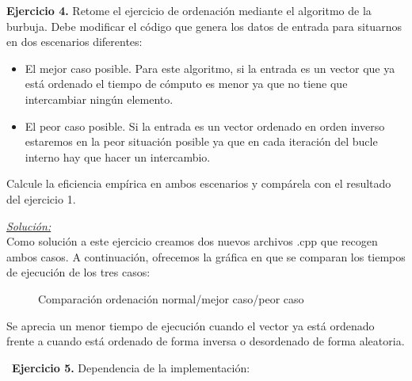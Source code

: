 \documentclass[titlepage, 12pt,a4paper]{article}
\begin{document}
	\textbf{\large Ejercicio 4.} Retome el ejercicio de ordenación mediante el algoritmo de la burbuja. Debe modificar el código que genera los datos de entrada para situarnos en dos escenarios diferentes:
	\begin{itemize}
	\item	El mejor caso posible. Para este algoritmo, si la entrada es un vector que ya está ordenado el tiempo de cómputo es menor ya que no tiene que intercambiar ningún elemento.
	\item	El peor caso posible. Si la entrada es un vector ordenado en orden inverso estaremos en la peor situación posible ya que en cada iteración del bucle interno hay que hacer un intercambio. 
	\end{itemize}
	Calcule la eficiencia empírica en ambos escenarios y compárela con el resultado del ejercicio 1.
\vspace {1em}	

\underline{\emph{Solución:}}\\
Como solución a este ejercicio creamos dos nuevos archivos .cpp que recogen ambos casos. A continuación, ofrecemos la gráfica en que se comparan los tiempos de ejecución de los tres casos:

\begin{figure}[!ht]
  \caption{Comparación ordenación normal/mejor caso/peor caso}
  \centering
\end{figure}  

Se aprecia un menor tiempo de ejecución cuando el vector ya está ordenado frente a cuando está ordenado de forma inversa o desordenado de forma aleatoria.
\newpage

\ 
  \textbf{\large Ejercicio 5.} Dependencia de la implementación:\\ 
  
\end{document}
